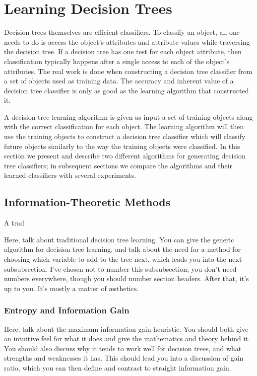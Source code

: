 \documentclass[12pt, letterpaper]{article}
\begin{document}
\section{Learning Decision Trees}
Decision trees themselves are efficient classifiers.  To classify an object,
all one needs to do is access the object's attributes and attribute values
while traversing the decision tree.  If a decision tree has one test
for each object attribute, then classification typically happens after a single
access to each of the object's attributes.  The real work is done when 
constructing a decision tree classifier from a set of objects used as training
data.  The accuracy and inherent value of a decision tree classifier is only as 
good as the learning algorithm that constructed it.

A decision tree learning algorithm is given as input a set of training objects 
along with the correct classification for each object.  The learning algorithm will
then use the training objects to construct a decision tree classifier which will classify
future objects similarly to the way the training objects were classified.
In this section we present and describe two different algorithms for generating decision
tree classifiers; in subsequent sections we compare the algorithms and their learned 
classifiers with several experiments.


\subsection{Information-Theoretic Methods}

A trad

Here, talk about traditional decision tree learning.  You can give the generic
algorithm for decision tree learning, and talk about the need for a method for
choosing which variable to add to the tree next, which leads you into the next
subsubsection.  I've chosen not to number this subsubsection; you don't need
numbers everywhere, though you should number section headers.  After that, it's
up to you.  It's mostly a matter of \ae sthetics.

\subsubsection*{Entropy and Information Gain}
Here, talk about the maximum information gain heuristic.  You should both give
an intuitive feel for what it does and give the mathematics and theory behind
it.  You should also discuss why it tends to work well for decision trees, and
what strengths and weaknesses it has.  This should lead you into a discussion of
gain ratio, which you can then define and contrast to straight information gain.
\end{document}
